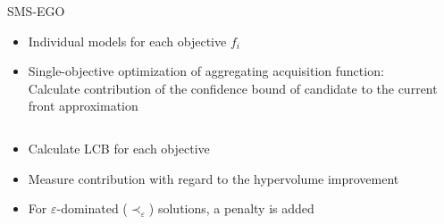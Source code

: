 \documentclass[11pt,compress,t,notes=noshow, xcolor=table]{beamer}
\begin{document}
\begin{frame}{SMS-EGO}

\begin{itemize}
\item Individual models for each objective $f_i$
\item Single-objective optimization of aggregating acquisition function: \\
  Calculate contribution of the confidence bound of candidate to the current front approximation
\end{itemize}

\begin{columns}

\begin{column}{0.55\textwidth}
\begin{itemize}
  \item Calculate LCB for each objective
  \item Measure contribution with regard to the hypervolume improvement
  \item For $\varepsilon$-dominated ($\prec_{\varepsilon}$) solutions, a penalty is added
\end{itemize}
\vfill
\end{column}

\begin{column}{0.45\textwidth}


\end{column}
\end{columns}
\end{frame}
\end{document}
